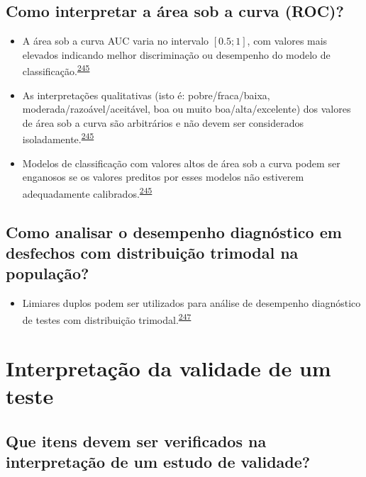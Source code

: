 \documentclass[
  a4paper,
]{book}
\providecommand{\tightlist}{%
  \setlength{\itemsep}{0pt}\setlength{\parskip}{0pt}}
\begin{document}
\hypertarget{como-interpretar-a-uxe1rea-sob-a-curva-roc}{%
\subsection{Como interpretar a área sob a curva (ROC)?}\label{como-interpretar-a-uxe1rea-sob-a-curva-roc}}

\begin{itemize}
\item
  A área sob a curva AUC varia no intervalo \([0.5; 1]\), com valores mais elevados indicando melhor discriminação ou desempenho do modelo de classificação.\textsuperscript{\protect\hyperlink{ref-de2022}{245}}
\item
  As interpretações qualitativas (isto é: pobre/fraca/baixa, moderada/razoável/aceitável, boa ou muito boa/alta/excelente) dos valores de área sob a curva são arbitrários e não devem ser considerados isoladamente.\textsuperscript{\protect\hyperlink{ref-de2022}{245}}
\item
  Modelos de classificação com valores altos de área sob a curva podem ser enganosos se os valores preditos por esses modelos não estiverem adequadamente calibrados.\textsuperscript{\protect\hyperlink{ref-de2022}{245}}
\end{itemize}

\hypertarget{como-analisar-o-desempenho-diagnuxf3stico-em-desfechos-com-distribuiuxe7uxe3o-trimodal-na-populauxe7uxe3o}{%
\subsection{Como analisar o desempenho diagnóstico em desfechos com distribuição trimodal na população?}\label{como-analisar-o-desempenho-diagnuxf3stico-em-desfechos-com-distribuiuxe7uxe3o-trimodal-na-populauxe7uxe3o}}

\begin{itemize}
\tightlist
\item
  Limiares duplos podem ser utilizados para análise de desempenho diagnóstico de testes com distribuição trimodal.\textsuperscript{\protect\hyperlink{ref-ferreira2021}{247}}
\end{itemize}

\hypertarget{interpretacao-desempenho}{%
\section{Interpretação da validade de um teste}\label{interpretacao-desempenho}}

\hypertarget{que-itens-devem-ser-verificados-na-interpretauxe7uxe3o-de-um-estudo-de-validade}{%
\subsection{Que itens devem ser verificados na interpretação de um estudo de validade?}\label{que-itens-devem-ser-verificados-na-interpretauxe7uxe3o-de-um-estudo-de-validade}}
\end{document}
